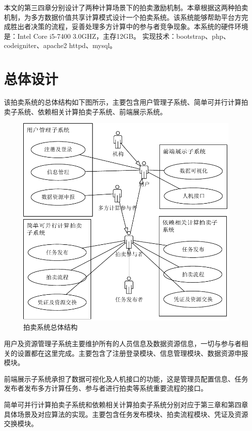 \documentclass[promaster]{thesis-uestc}
\begin{document}
本文的第三四章分别设计了两种计算场景下的拍卖激励机制。本章根据这两种拍卖机制，为多方数据价值共享计算模式设计一个拍卖系统。该系统能够帮助平台方完成胜出者决策的流程，妥善处理多方计算中的参与者竞争现象。本系统的硬件环境是：Intel Core i5-7400 3.0GHZ，主存12GB。
实现技术：bootstrap、php、codeigniter、apache2 httpd、mysql。
\section{总体设计}
该拍卖系统的总体结构如下图所示，主要包含用户管理子系统、简单可并行计算拍卖子系统、依赖相关计算拍卖子系统、前端展示系统。

\begin{figure}[H]
    \includegraphics{pic/yongli.pdf}
    \caption{拍卖系统总体结构}
\end{figure}

用户及资源管理子系统主要维护所有的人员信息及数据资源信息，一切与参与者相关的设置都在这里完成。主要包含了注册登录模块、信息管理模块、数据资源申报模块。

前端展示子系统承担了数据可视化及人机接口的功能，这是管理员配置信息、任务发布者发布多方计算任务、参与者进行拍卖等系统重要流程的接口。

简单可并行计算拍卖子系统和依赖相关计算拍卖子系统分别对应于第三章和第四章具体场景及对应算法的实现。主要包含任务发布模块、拍卖流程模块、凭证及资源交换模块。
\end{document}

